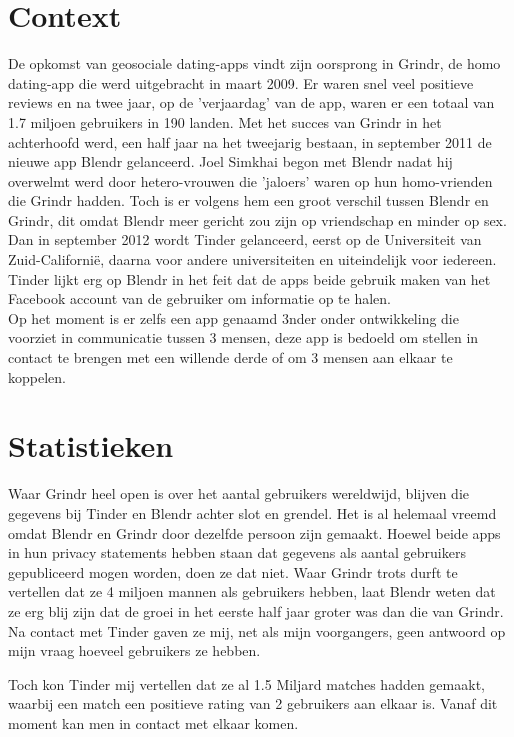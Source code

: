 \documentclass[pdftex,12pt,a4paper]{article}
\begin{document}


\section{Context}
De opkomst van geosociale dating-apps vindt zijn oorsprong in Grindr, de homo dating-app die werd uitgebracht in maart 2009. Er waren snel veel positieve reviews en na twee jaar, op de 'verjaardag' van de app, waren er een totaal van 1.7 miljoen gebruikers in 190 landen. Met het succes van Grindr in het achterhoofd werd, een half jaar na het tweejarig bestaan, in september 2011 de nieuwe app Blendr gelanceerd. Joel Simkhai begon met Blendr nadat hij overwelmt werd door hetero-vrouwen die 'jaloers' waren op hun homo-vrienden die Grindr hadden. Toch is er volgens hem een groot verschil tussen Blendr en Grindr, dit omdat Blendr meer gericht zou zijn op vriendschap en minder op sex.
\\

Dan in september 2012 wordt Tinder gelanceerd, eerst op de Universiteit van Zuid-Californië, daarna voor andere universiteiten en uiteindelijk voor iedereen. Tinder lijkt erg op Blendr in het feit dat de apps beide gebruik maken van het Facebook account van de gebruiker om informatie op te halen.
\\

Op het moment is er zelfs een app genaamd 3nder onder ontwikkeling die voorziet in communicatie tussen 3 mensen, deze app is bedoeld om stellen in contact te brengen met een willende derde of om 3 mensen aan elkaar te koppelen.

\section{Statistieken}
Waar Grindr heel open is over het aantal gebruikers wereldwijd, blijven die gegevens bij Tinder en Blendr achter slot en grendel. Het is al helemaal vreemd omdat Blendr en Grindr door dezelfde persoon zijn gemaakt. Hoewel beide apps in hun privacy statements hebben staan dat gegevens als aantal gebruikers gepubliceerd mogen worden, doen ze dat niet. Waar Grindr trots durft te vertellen dat ze 4 miljoen mannen als gebruikers hebben, laat Blendr weten dat ze erg blij zijn dat de groei in het eerste half jaar groter was dan die van Grindr.\cite{creeped2013} Na contact met Tinder gaven ze mij, net als mijn voorgangers, geen antwoord op mijn vraag hoeveel gebruikers ze hebben.

Toch kon Tinder mij vertellen dat ze al 1.5 Miljard matches hadden gemaakt, waarbij een match een positieve rating van 2 gebruikers aan elkaar is. Vanaf dit moment kan men in contact met elkaar komen. 
\end{document}
